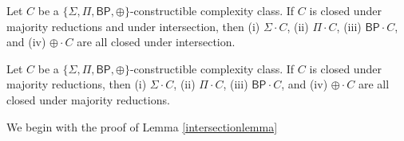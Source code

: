 \documentclass[11pt]{article}
\newcommand{\bp}{\textsf{BP}}
\newcommand{\parity}{\oplus}
\begin{document}
\begin{lemma}\label{intersectionlemma}
Let $C$ be a \emph{$\{\Sigma,\Pi,\bp,\parity\}$}-constructible complexity class. If $C$ is closed under majority reductions and under intersection, then (i) \emph{$\Sigma \cdot C$}, (ii) \emph{$\Pi \cdot C$}, (iii) \emph{$\bp \cdot C$}, and (iv) \emph{$\parity \cdot C$} are all closed under intersection.
\end{lemma}

\begin{lemma}\label{amplifymainlemma}
Let $C$ be a \emph{$\{\Sigma,\Pi,\bp,\parity\}$}-constructible complexity class. If $C$ is closed under majority reductions, then (i) \emph{$\Sigma \cdot C$}, (ii) \emph{$\Pi \cdot C$}, (iii) \emph{$\bp \cdot C$}, and (iv) \emph{$\parity \cdot C$} are all closed under majority reductions.
\end{lemma}
We begin with the proof of Lemma \ref{intersectionlemma}
\end{document}
